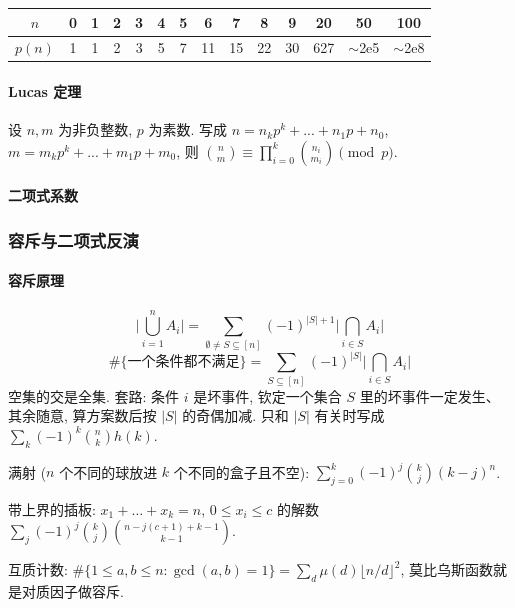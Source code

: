 		\begin{center}
		\begin{tabular}{c|c@{\ }c@{\ }c@{\ }c@{\ }c@{\ }c@{\ }c@{\ }c@{\ }c@{\ }c@{\ }c@{\ }c@{\ }c}
			$n$    & 0 & 1 & 2 & 3 & 4 & 5 & 6  & 7  & 8  & 9  & 20  & 50  & 100 \\ \hline
			$p(n)$ & 1 & 1 & 2 & 3 & 5 & 7 & 11 & 15 & 22 & 30 & 627 & $\mathtt{\sim}$2e5 & $\mathtt{\sim}$2e8 \\
		\end{tabular}
		\end{center}

	\paragraph{Lucas 定理}
		设 $n,m$ 为非负整数, $p$ 为素数. 写成 $n=n_kp^k+...+n_1p+n_0$, $m=m_kp^k+...+m_1p+m_0$, 则 $\binom{n}{m} \equiv \prod_{i=0}^k\binom{n_i}{m_i} \pmod{p}$.

	\paragraph{二项式系数}

\subsubsection{容斥与二项式反演}
	\paragraph{容斥原理}
		\[ \Big|\bigcup_{i=1}^n A_i\Big| = \sum_{\emptyset\ne S\subseteq[n]} (-1)^{|S|+1} \Big|\bigcap_{i\in S} A_i\Big| \]
		\[ \#\{\text{一个条件都不满足}\} = \sum_{S\subseteq[n]} (-1)^{|S|} \Big|\bigcap_{i\in S} A_i\Big| \]
		空集的交是全集. 套路: 条件 $i$ 是坏事件, 钦定一个集合 $S$ 里的坏事件一定发生、其余随意, 算方案数后按 $|S|$ 的奇偶加减. 只和 $|S|$ 有关时写成 $\sum_k (-1)^k \binom{n}{k} h(k)$.
		\begin{compactitem}
		\item 满射 ($n$ 个不同的球放进 $k$ 个不同的盒子且不空): $\sum_{j=0}^{k}(-1)^j\binom{k}{j}(k-j)^n$.
		\item 带上界的插板: $x_1+\dots+x_k=n$, $0\le x_i\le c$ 的解数 $\sum_{j}(-1)^j\binom{k}{j}\binom{n-j(c+1)+k-1}{k-1}$.
		\item 互质计数: $\#\{1\le a,b\le n: \gcd(a,b)=1\} = \sum_{d}\mu(d)\lfloor n/d\rfloor^2$, 莫比乌斯函数就是对质因子做容斥.
		\end{compactitem}
